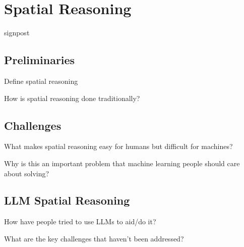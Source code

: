 \section{Spatial Reasoning}
\label{section:background}

signpost

\subsection{Preliminaries}
Define spatial reasoning

How is spatial reasoning done traditionally?


\subsection{Challenges}
What makes spatial reasoning easy for humans but difficult for machines?

Why is this an important problem that machine learning people should care about solving?


\subsection{LLM Spatial Reasoning}
How have people tried to use LLMs to aid/do it?

What are the key challenges that haven't been addressed?